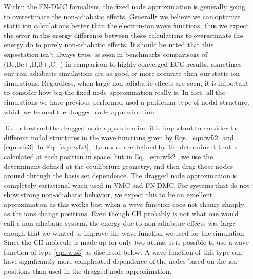 \documentclass[aip,jcp,numerical,reprint]{revtex4-1}
\begin{document}
Within the FN-DMC formalism, the fixed node approximation is generally going to overestimate the non-adiabatic effects.   Generally we believe we can optimize static ion calculations better than the electron-ion wave functions, thus we expect the error in the energy difference between these calculations to overestimate the energy do to purely non-adiabatic effects.  It should be noted that this expectation isn't always true, as seen in benchmarks comparisons of (Be,Be+,B,B+,C+) in comparison to highly converged ECG results, sometimes our non-adiabatic simulations are as good or more accurate than our static ion simulations.  Regardless, when large non-adiabatic effects are soon, it is important to consider how big the fixed-node approximation really is.  In fact, all the simulations we have previous performed used a particular type of nodal structure, which we termed the dragged node approximation.
 
To understand the dragged node approximation  it is important to consider the different nodal structures in the wave functions given by Eqs.~\eqref{eqn:wfs2} and \eqref{eqn:wfs3}.  In Eq.~\eqref{eqn:wfs3}, the nodes are defined by the determinant that is calculated at each position in space, but in Eq.~\eqref{eqn:wfs2}, we use the determinant defined at the equilibrium geometry, and then drag those nodes around through the basis set dependence.   The dragged node approximation is completely variational when used in VMC and FN-DMC.  
For systems that do not show strong non-adiabatic behavior, we expect this to be an excellent approximation as this works best when a wave function does not change sharply as the ions change positions.   Even though CH probably is not what one would call a non-adiabatic system, the energy due to non-adiabatic effects was large enough that we wanted to improve the wave function we used for the simulation.    Since the CH molecule is made up for only two atoms, it is possible to use a wave function of type \eqref{eqn:wfs3} as discussed below.   A wave function of this type can have significantly more complicated dependence of the nodes based on the ion positions than used in the dragged node approximation.
\end{document}
